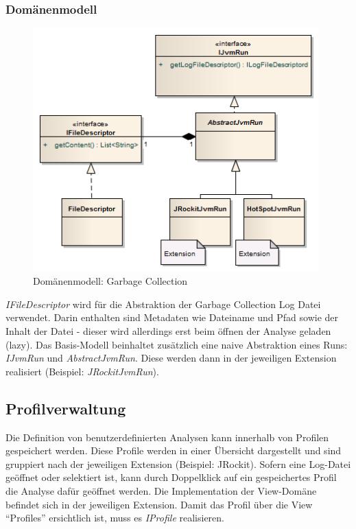 \subsubsection{Domänenmodell}
 \begin{figure}[H]
  	\centering
        	\caption{Domänenmodell: Garbage Collection}
    	\includegraphics[width=11cm]{images/core_domain}
\end{figure}
\textit{IFileDescriptor} wird für die Abstraktion der Garbage Collection Log Datei verwendet. Darin enthalten sind Metadaten wie Dateiname und Pfad sowie der Inhalt der Datei - dieser wird allerdings erst beim öffnen der Analyse geladen (lazy). Das Basis-Modell beinhaltet zusätzlich eine naive Abstraktion eines Runs: \textit{IJvmRun} und \textit{AbstractJvmRun}. Diese werden dann in der jeweiligen Extension realisiert (Beispiel: \textit{JRockitJvmRun}). 

\subsection{Profilverwaltung}
Die Definition von benutzerdefinierten Analysen kann innerhalb von Profilen gespeichert werden. Diese Profile werden in einer Übersicht dargestellt und sind gruppiert nach der jeweiligen Extension (Beispiel: JRockit). Sofern eine Log-Datei geöffnet oder selektiert ist, kann durch Doppelklick auf ein gespeichertes Profil die Analyse dafür geöffnet werden. Die Implementation der View-Domäne befindet sich in der jeweiligen Extension. Damit das Profil über die View ``Profiles'' ersichtlich ist, muss es \textit{IProfile} realisieren.

